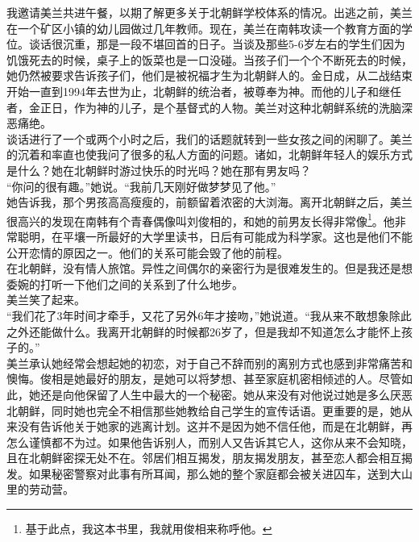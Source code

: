 我邀请美兰共进午餐，以期了解更多关于北朝鲜学校体系的情况。出逃之前，美兰在一个矿区小镇的幼儿园做过几年教师。现在，美兰在南韩攻读一个教育方面的学位。谈话很沉重，那是一段不堪回首的日子。当谈及那些5-6岁左右的学生们因为饥饿死去的时候，桌子上的饭菜也是一口没碰。当孩子们一个个不断死去的时候，她仍然被要求告诉孩子们，他们是被祝福才生为北朝鲜人的。金日成，从二战结束开始一直到1994年去世为止，北朝鲜的统治者，被尊奉为神。而他的儿子和继任者，金正日，作为神的儿子，是个基督式的人物。美兰对这种北朝鲜系统的洗脑深恶痛绝。\\

谈话进行了一个或两个小时之后，我们的话题就转到一些女孩之间的闲聊了。美兰的沉着和率直也使我问了很多的私人方面的问题。诸如，北朝鲜年轻人的娱乐方式是什么？她在北朝鲜时游过快乐的时光吗？她在那有男友吗？\\

“你问的很有趣。”她说。“我前几天刚好做梦梦见了他。”\\

她告诉我，那个男孩高高瘦瘦的，前额留着浓密的大浏海。离开北朝鲜之后，美兰很高兴的发现在南韩有个青春偶像叫刘俊相的，和她的前男友长得非常像\footnote{基于此点，我这本书里，我就用俊相来称呼他。}。他非常聪明，在平壤一所最好的大学里读书，日后有可能成为科学家。这也是他们不能公开恋情的原因之一。他们的关系可能会毁了他的前程。\\

在北朝鲜，没有情人旅馆。异性之间偶尔的亲密行为是很难发生的。但是我还是想委婉的打听一下他们之间的关系到了什么地步。\\

美兰笑了起来。\\

“我们花了3年时间才牵手，又花了另外6年才接吻，”她说道。“我从来不敢想象除此之外还能做什么。我离开北朝鲜的时候都26岁了，但是我却不知道怎么才能怀上孩子的。”\\

美兰承认她经常会想起她的初恋，对于自己不辞而别的离别方式也感到非常痛苦和懊悔。俊相是她最好的朋友，是她可以将梦想、甚至家庭机密相倾述的人。尽管如此，她还是向他保留了人生中最大的一个秘密。她从来没有对他说过她是多么厌恶北朝鲜，同时她也完全不相信那些她教给自己学生的宣传话语。更重要的是，她从来没有告诉他关于她家的逃离计划。这并不是因为她不信任他，而是在北朝鲜，再怎么谨慎都不为过。如果他告诉别人，而别人又告诉其它人，这你从来不会知晓，且在北朝鲜密探无处不在。邻居们相互揭发，朋友揭发朋友，甚至恋人都会相互揭发。如果秘密警察对此事有所耳闻，那么她的整个家庭都会被关进囚车，送到大山里的劳动营。\\

